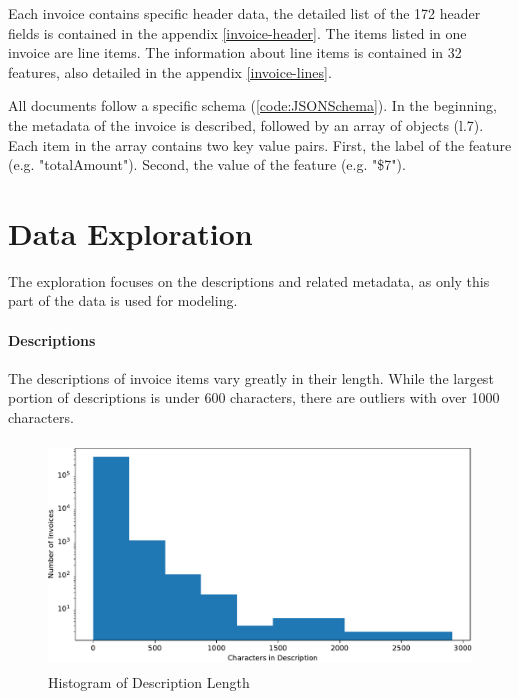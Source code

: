Each invoice contains specific header data, the detailed list of the 172 header fields is contained in the appendix \ref{invoice-header}. 
The items listed in one invoice are line items. The information about line items is contained in 32 features, also detailed in the appendix \ref{invoice-lines}.

All documents follow a specific schema (\ref{code:JSONSchema}). In the beginning, the metadata of the invoice is described, followed by an array of objects (l.7). Each item in the array contains two key value pairs. First, the label of the feature (e.g. "totalAmount"). Second, the value of the feature (e.g. "\$7").






\section{Data Exploration}
The exploration focuses on the descriptions and related metadata, as only this part of the data is used for modeling.
\paragraph{Descriptions}
The descriptions of invoice items vary greatly in their length. While the largest portion of descriptions is under 600 characters, there are outliers with over 1000 characters. 
\begin{figure}[h!]
	\centering
	\includegraphics[height=6cm]{Bilder/hist_description.pdf}
	\caption{Histogram of Description Length}
	\label{fig:languages-bar}
\end{figure}

